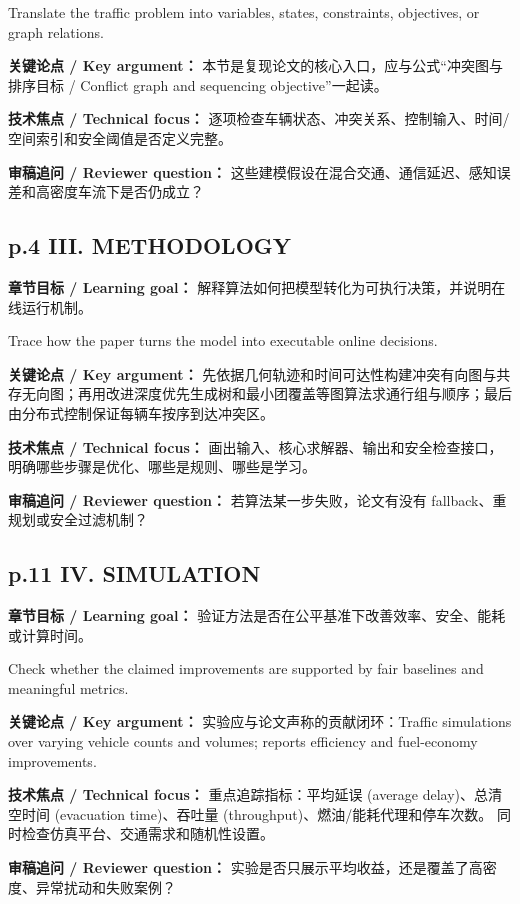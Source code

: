 \documentclass[UTF8,a4paper,11pt,fontset=fandol]{ctexart}
\begin{document}
Translate the traffic problem into variables, states, constraints, objectives, or graph relations.

\textbf{关键论点 / Key argument：} 本节是复现论文的核心入口，应与公式“冲突图与排序目标 / Conflict graph and sequencing objective”一起读。

\textbf{技术焦点 / Technical focus：} 逐项检查车辆状态、冲突关系、控制输入、时间/空间索引和安全阈值是否定义完整。

\textbf{审稿追问 / Reviewer question：} 这些建模假设在混合交通、通信延迟、感知误差和高密度车流下是否仍成立？

\subsection*{p.4 III. METHODOLOGY}
\textbf{章节目标 / Learning goal：} 解释算法如何把模型转化为可执行决策，并说明在线运行机制。

Trace how the paper turns the model into executable online decisions.

\textbf{关键论点 / Key argument：} 先依据几何轨迹和时间可达性构建冲突有向图与共存无向图；再用改进深度优先生成树和最小团覆盖等图算法求通行组与顺序；最后由分布式控制保证每辆车按序到达冲突区。

\textbf{技术焦点 / Technical focus：} 画出输入、核心求解器、输出和安全检查接口，明确哪些步骤是优化、哪些是规则、哪些是学习。

\textbf{审稿追问 / Reviewer question：} 若算法某一步失败，论文有没有 fallback、重规划或安全过滤机制？

\subsection*{p.11 IV. SIMULATION}
\textbf{章节目标 / Learning goal：} 验证方法是否在公平基准下改善效率、安全、能耗或计算时间。

Check whether the claimed improvements are supported by fair baselines and meaningful metrics.

\textbf{关键论点 / Key argument：} 实验应与论文声称的贡献闭环：Traffic simulations over varying vehicle counts and volumes; reports efficiency and fuel-economy improvements.

\textbf{技术焦点 / Technical focus：} 重点追踪指标：平均延误 (average delay)、总清空时间 (evacuation time)、吞吐量 (throughput)、燃油/能耗代理和停车次数。 同时检查仿真平台、交通需求和随机性设置。

\textbf{审稿追问 / Reviewer question：} 实验是否只展示平均收益，还是覆盖了高密度、异常扰动和失败案例？
\end{document}

